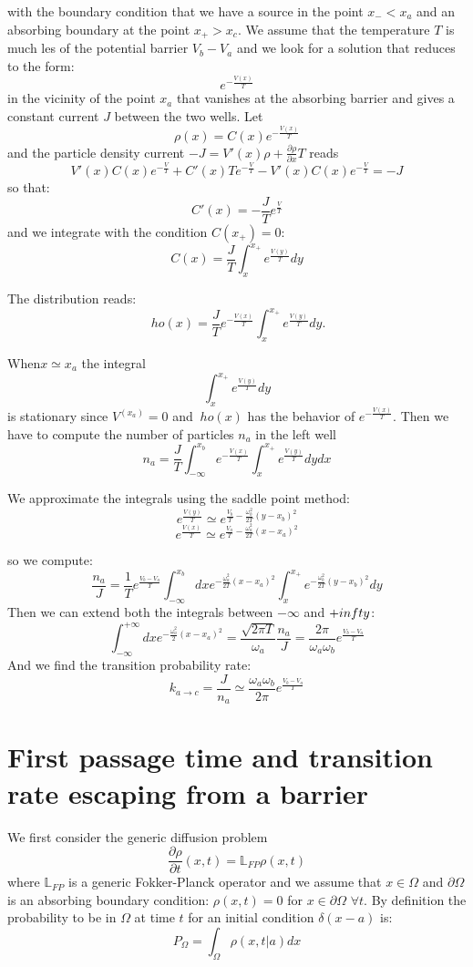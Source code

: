with the boundary condition that we have a source in the point $x_{-} < x_a$ and an absorbing boundary at the point $x_{+} > x_c$. We assume that the temperature $T$ is much les of the potential barrier $V_b - V_a$ and we look for a solution that reduces to the form:
$$
e^{-\frac{V(x)}{T}}
$$
in the vicinity of the point $x_a$ that vanishes at the absorbing barrier and gives a constant current $J$ between the two wells. Let
\begin{equation}
\rho(x)=C(x)e^{-\frac{V(x)}{T}}
\end{equation}
and the particle density current $-J=V'(x)\rho + \frac{\partial \rho}{\partial x}T$ reads
$$
V'(x)C(x)e^{-\frac{V}{T}} + C'(x)Te^{-\frac{V}{T}} - V'(x)C(x)e^{-\frac{V}{T}} = -J
$$
so that: 
$$
C'(x) = -\frac{J}{T}e^{\frac{V}{T}}
$$
and we integrate with the condition $C(x_{+}) = 0$:
$$
C(x) = \frac{J}{T}\int_{x}^{x_{+}} e^{\frac{V(y)}{T}}dy
$$

The distribution reads:
$$
\
ho(x) = \frac{J}{T} e^{-\frac{V(x)}{T}}\int_x^{x_{+}}e^{\frac{V(y)}{T}}dy.
$$

When$x \simeq x_a$ the integral
$$
\int_x^{x_{+}}e^{\frac{V(y)}{T}}dy
$$
is stationary since $V^(x_a) = 0$ and $\
ho(x)$ has the behavior of $e^{-\frac{V(x)}{T}}$.
Then we have to compute the number of particles $n_a$ in the left well
$$
n_a = \frac{J}{T}\int_{-\infty}^{x_{b}} e^{-\frac{V(x)}{T}} \int_{x}^{x_+} e^{\frac{V(y)}{T}} dy dx
$$

We approximate the integrals using the saddle point method:
$$
e^{\frac{V(y)}{T}} \simeq e^{\frac{V_b}{T} - \frac{\omega^2_b}{2T}(y-x_b)^2}
$$
$$
e^{\frac{V(x)}{T}} \simeq e^{\frac{V_a}{T} - \frac{\omega^2_a}{2T}(x-x_a)^2}
$$

so we compute:
$$
\frac{n_a}{J} = \frac{1}{T} e^{\frac{V_b-V_a}{T}}\int_{-\infty}^{x_b}dxe^{-\frac{\omega_a^2}{2T}(x-x_a)^2}\int_x^{x_+}e^{-\frac{\omega_b^2}{2T}(y-x_b)^2 }dy
$$
Then we can extend both the integrals between $-\infty$ and $+\\infty$:
$$
\int_{-\infty}^{+\infty}dxe^{-\frac{\omega_a^2}{2}(x-x_a)^2} = \frac{\sqrt{2 \pi T}}{\omega_a}\frac{n_a}{J}=\frac{2\pi}{\omega_a\omega_b}e^{\frac{V_b-V_a}{T}}
$$
And we find the transition probability rate:
$$
k_{a\to c} = \frac{J}{n_a} \simeq \frac{\omega_a \omega_b}{2 \pi} e^{\frac{V_b-V_a}{T}}
$$

\section{First passage time and transition rate escaping from a barrier}
We first consider the generic diffusion problem 
$$
\frac{\partial \rho}{\partial t} (x,t) = \mathbb{L}_{FP} \rho(x,t)
$$
where $\mathbb{L}_{FP}$ is a generic Fokker-Planck operator and we assume that $x \in \Omega$ and $\partial \Omega$ is an absorbing boundary condition: $\rho(x,t) =0 $ for $x\in \partial \Omega$ $\forall t$. By definition the probability to be in $\Omega$ at time $t$ for an initial condition $\delta(x-a)$ is:
$$
P_{\Omega} = \int_{\Omega} \rho(x,t|a)dx 
$$

